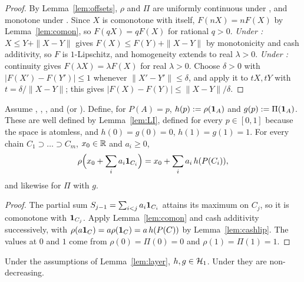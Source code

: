 \begin{proof}
By Lemma~\ref{lem:offsets}, $\rho$ and $\Pi$ are uniformly continuous under \axRC, and monotone under \axRM.
Since $X$ is comonotone with itself, $F(nX)=nF(X)$ by Lemma~\ref{lem:comon}, so $F(qX)=qF(X)$ for rational $q>0$.
\emph{Under \axRM:} $X\le Y+\|X-Y\|$ gives $F(X)\le F(Y)+\|X-Y\|$ by monotonicity and cash additivity, so $F$ is
$1$-Lipschitz, and homogeneity extends to real $\lambda>0$. \emph{Under \axRC:} continuity gives
$F(\lambda X)=\lambda F(X)$ for real $\lambda>0$. Choose $\delta>0$ with $|F(X')-F(Y')|\le1$ whenever
$\|X'-Y'\|\le\delta$, and apply it to $tX,tY$ with $t=\delta/\|X-Y\|$; this gives
$|F(X)-F(Y)|\le\|X-Y\|/\delta$. \qedhere
\end{proof}

\begin{lemma}\label{lem:layer}
Assume \axP, \axN, \axCM, \axLI{} and \axRC{} (or \axRM). Define, for $P(A)=p$, $h(p):=\rho(\mathbf 1_A)$ and
$g(p):=\Pi(\mathbf 1_A)$. These are well defined by Lemma~\ref{lem:LI}, defined for every $p\in[0,1]$ because the
space is atomless, and $h(0)=g(0)=0$, $h(1)=g(1)=1$. For every chain $C_1\supset\dots\supset C_m$, $x_0\in\mathbb R$
and $a_i\ge0$,
\begin{equation}\label{eq:layer}
 \rho\Big(x_0+\sum_i a_i\mathbf 1_{C_i}\Big)=x_0+\sum_i a_i\,h(P(C_i)),
\end{equation}
and likewise for $\Pi$ with $g$.
\end{lemma}

\begin{proof}
The partial sum $S_{j-1}=\sum_{i<j}a_i\mathbf 1_{C_i}$ attains its maximum on $C_j$, so it is comonotone with
$\mathbf 1_{C_j}$. Apply Lemma~\ref{lem:comon} and cash additivity successively, with
$\rho(a\mathbf 1_C)=a\rho(\mathbf 1_C)=a\,h(P(C))$ by Lemma~\ref{lem:cashlip}. The values at $0$ and $1$ come from
$\rho(0)=\Pi(0)=0$ and $\rho(1)=\Pi(1)=1$. \qedhere
\end{proof}

\begin{lemma}\label{lem:bv}
Under the assumptions of Lemma~\ref{lem:layer}, $h,g\in\mathcal H_1$. Under \axRM{} they are non-decreasing.
\end{lemma}

